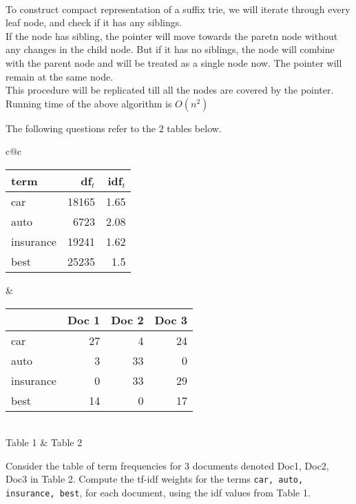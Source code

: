 \documentclass[addpoints]{exam}
\begin{document}
\begin{questions}
  \begin{solution}
    \\
    To construct compact representation of a suffix trie, we will iterate through every leaf node, and check  if it has any siblings.\\
    If the node has sibling, the pointer will move towards the paretn node without any changes in the child node. But if it has no siblings, the node will combine with the parent node and will be treated as a single node now. The pointer will remain at the same node.\\
    This procedure will be replicated till all the nodes are covered by the pointer.\\
    Running time of the above algorithm is $O(n^2)$  
  \end{solution}
\newpage
  \begin{EnvUplevel}
    The following questions refer to the 2 tables below.

    \begin{tabular}{c@{\hspace{50pt}}c}
      \begin{tabular}{|l|r|r|}
        \hline
        term & df$_t$ & idf$_t$\\\hline
        car & 18165 & 1.65\\
        auto & 6723 & 2.08\\
        insurance & 19241 & 1.62\\
        best & 25235 & 1.5\\
        \hline
      \end{tabular}
             &
               \begin{tabular}{|l|r|r|r|}
                 \hline
                 & Doc 1 & Doc 2 & Doc 3\\\hline
                 car & 27 & 4 & 24\\
                 auto & 3 & 33 & 0\\
                 insurance & 0 & 33 & 29\\
                 best & 14 & 0 & 17 \\\hline
               \end{tabular}\\
      Table 1 & Table 2
    \end{tabular}
  \end{EnvUplevel}
  \question[10]
  Consider the table of term frequencies for 3 documents denoted Doc1, Doc2, Doc3 in Table 2. Compute the tf-idf weights for the terms {\tt car, auto, insurance, best}, for each document, using the idf values from Table 1.


\end{questions}
\end{document}
